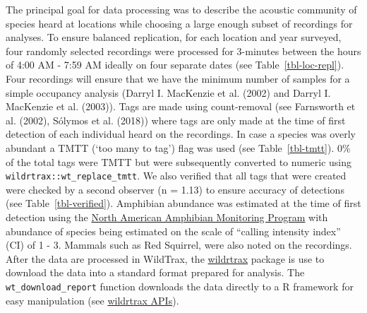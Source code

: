 \documentclass[
  letterpaper,
  DIV=11,
  numbers=noendperiod]{scrartcl}
\begin{document}
The principal goal for data processing was to describe the acoustic
community of species heard at locations while choosing a large enough
subset of recordings for analyses. To ensure balanced replication, for
each location and year surveyed, four randomly selected recordings were
processed for 3-minutes between the hours of 4:00 AM - 7:59 AM ideally
on four separate dates (see Table~\ref{tbl-loc-repl}). Four recordings
will ensure that we have the minimum number of samples for a simple
occupancy analysis (Darryl I. MacKenzie et al. (2002) and Darryl I.
MacKenzie et al. (2003)). Tags are made using count-removal (see
Farnsworth et al. (2002), Sólymos et al. (2018)) where tags are only
made at the time of first detection of each individual heard on the
recordings. In case a species was overly abundant a TMTT (`too many to
tag') flag was used (see Table~\ref{tbl-tmtt}). 0\% of the total tags
were TMTT but were subsequently converted to numeric using
\texttt{wildrtrax::wt\_replace\_tmtt}. We also verified that all tags
that were created were checked by a second observer (n = 1.13) to ensure
accuracy of detections (see Table~\ref{tbl-verified}). Amphibian
abundance was estimated at the time of first detection using the
\href{https://www.usgs.gov/centers/eesc/science/north-american-amphibian-monitoring-program}{North
American Amphibian Monitoring Program} with abundance of species being
estimated on the scale of ``calling intensity index'' (CI) of 1 - 3.
Mammals such as Red Squirrel, were also noted on the recordings. After
the data are processed in WildTrax, the
\href{https://abbiodiversity.github.io/wildrtrax/}{wildrtrax} package is
use to download the data into a standard format prepared for analysis.
The \texttt{wt\_download\_report} function downloads the data directly
to a R framework for easy manipulation (see
\href{https://abbiodiversity.github.io/wildrtrax/articles/apis.html}{wildrtrax
APIs}).
\end{document}
